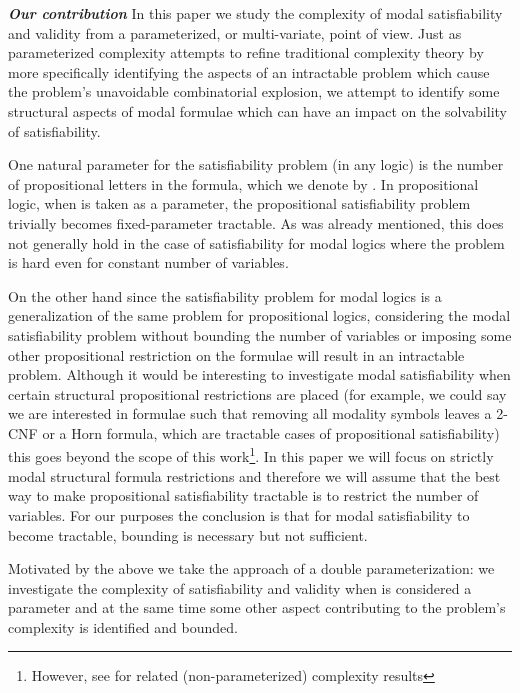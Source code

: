 \documentclass{llncs}
\begin{document}
\textit{\textbf{Our contribution}}
In this paper we study the complexity of modal satisfiability and
validity from a parameterized, or multi-variate, point of view. Just
as parameterized complexity attempts to refine traditional
complexity theory by more specifically identifying the aspects of an
intractable problem which cause the problem's unavoidable
combinatorial explosion, we attempt to identify some structural aspects of
modal formulae which can have an impact on the solvability of
satisfiability.


One natural parameter for the satisfiability problem (in any logic)
is the number of propositional letters in the formula, which we
denote by . In propositional logic, when  is taken as a
parameter, the propositional satisfiability problem trivially
becomes fixed-parameter tractable.  As was already mentioned, this
does not generally hold in the case of satisfiability for modal
logics where the problem is hard even for constant number of
variables.

On the other hand since the satisfiability problem for modal logics
is a generalization of the same problem for propositional logics,
considering the modal satisfiability problem without bounding the
number of variables or imposing some other propositional restriction
on the formulae will result in an intractable problem. Although it
would be interesting to investigate modal satisfiability when
certain structural propositional restrictions are placed (for
example, we could say we are interested in formulae such that
removing all modality symbols leaves a 2-CNF or a Horn formula,
which are tractable cases of propositional satisfiability) this goes
beyond the scope of this work\footnote{However, see
\cite{nguyen2005cfm} for related (non-parameterized) complexity
results}. In this paper we will focus on strictly modal structural
formula restrictions and therefore we will assume that the best way
to make propositional satisfiability tractable is to restrict the
number of variables. For our purposes the conclusion is that for
modal satisfiability to become tractable, bounding  is necessary
but not sufficient.

Motivated by the above we take the approach of a double
parameterization: we investigate the complexity of satisfiability
and validity when  is considered a parameter and at the same time
some other aspect contributing to the problem's complexity is
identified and bounded.
\end{document}
